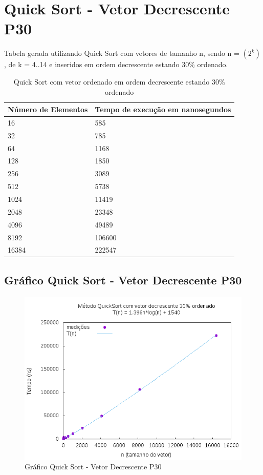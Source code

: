 \documentclass[12pt,a4paper,twoside]{report}
\begin{document}
\section{Quick Sort - Vetor Decrescente P30}
Tabela gerada utilizando Quick Sort com vetores de tamanho n, sendo n = $(2^k)$, de k = 4..14 e inseridos em ordem decrescente estando 30\% ordenado.
\begin{table}[H]
\centering
\caption{Quick Sort com vetor ordenado em ordem decrescente estando 30\% ordenado}
\label{my-label}
\begin{tabular}{|l|l|}
\hline
\multicolumn{1}{|c|}{\textbf{Número de Elementos}} & \multicolumn{1}{c|}{\textbf{Tempo de execução em nanosegundos}} \\ \hline
16 & 585 \\ \hline
32 & 785 \\ \hline
64 & 1168 \\ \hline
128 & 1850 \\ \hline
256 & 3089 \\ \hline
512 & 5738 \\ \hline
1024 & 11419 \\ \hline
2048 & 23348 \\ \hline
4096 & 49489 \\ \hline
8192 & 106600 \\ \hline
16384 & 222547 \\ \hline
\end{tabular}
\end{table}

\subsection{Gráfico Quick Sort - Vetor Decrescente P30}
\begin{figure}[H]
    \centering
    \includegraphics[width=0.7\linewidth]{graficos/QuickSort/vIntDecrescenteP30/vIntDecrescenteP30.png}
  \caption{Gráfico Quick Sort - Vetor Decrescente P30}
\end{figure}
\end{document}

